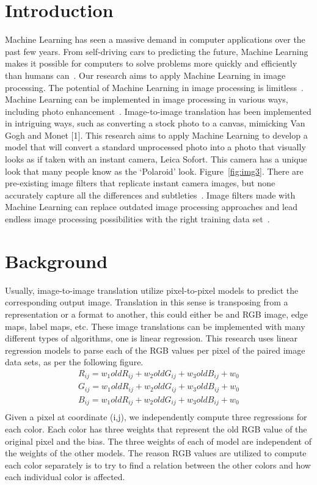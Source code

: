 \documentclass[conference]{IEEEtran}
\begin{document}
\section{Introduction}\label{section:Introduction}
Machine Learning has seen a massive demand in computer applications over the past few years. From self-driving cars to predicting the future, Machine Learning makes it possible for computers to solve problems more quickly and efficiently than humans can~\cite{howard2014public}. Our research aims to apply Machine Learning in image processing. The potential of Machine Learning in image processing is limitless~\cite{lebanimg}. Machine Learning can be implemented in image processing in various ways, including photo enhancement~\cite{zhu2017unpaired}. Image-to-image translation has been implemented in intriguing ways, such as converting a stock photo to a canvas, mimicking Van Gogh and Monet [1].
 This research aims to apply Machine Learning to develop a model that will convert a standard unprocessed photo into a photo that visually looks as if taken with an instant camera, Leica Sofort. This camera has a unique look that many people know as the ‘Polaroid’ look. Figure~\ref{fig:img3}. There are pre-existing image filters that replicate instant camera images, but none accurately capture all the differences and subtleties~\cite{instalab}. Image filters made with Machine Learning can replace outdated image processing approaches and lead endless image processing possibilities with the right training data set~\cite{spreeuwers1994image}. 

\section{Background}\label{section:Background}
Usually,  image-to-image translation utilize pixel-to-pixel models to predict the corresponding output image. Translation in this sense is transposing from a representation or a format to another, this could either be and RGB image, edge maps, label maps, etc. 
These image translations can be implemented with many different types of algorithms, one is linear regression. This research uses linear regression models to parse each of the RGB values per pixel of the paired image data sets, as per the following figure. \\

\[
\begin{array}{c}
R_{ij} = w_{1} oldR_{ij} + w_{2}oldG_{ij}+ w_{3}oldB_{ij} + w_{0} \\
G_{ij} = w_{1} oldR_{ij} + w_{2}oldG_{ij}+ w_{3}oldB_{ij} + w_{0} \\
B_{ij} = w_{1} oldR_{ij} + w_{2}oldG_{ij}+ w_{3}oldB_{ij} + w_{0} \\
\end{array}
\]
Given a pixel at coordinate (i,j), we independently compute three regressions for each color. Each color has three weights that represent the old RGB value of the original pixel and the bias.
The three weights of each of model are independent of the weights of the other models.
The reason RGB values are utilized to compute each color separately is to try to find a relation between the other colors and how each individual color is affected.
\end{document}
